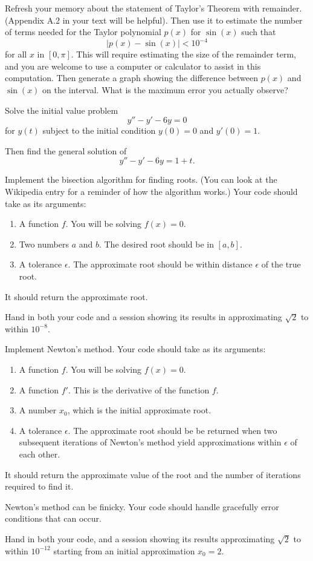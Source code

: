 \documentclass[minion]{homework}
\begin{document}
\begin{problems}

\problem Refresh your memory about the statement of Taylor's Theorem
with remainder.  (Appendix A.2 in your text will be helpful).  Then
use it to estimate the number of terms needed for the Taylor polynomial $p(x)$ for $\sin(x)$ such that
\[
|p(x)-\sin(x)|< 10^{-4}
\]
for all $x$ in $[0,\pi]$.  This will require estimating the size
of the remainder term, and you are welcome to use a computer or calculator to assist in this computation.  Then generate a graph
showing the difference between $p(x)$ and $\sin(x)$ on
the interval.  What is the maximum error you actually observe?

\problem  Solve the initial value problem
\[
y''-y'-6y = 0
\]
for $y(t)$ subject to the initial condition $y(0)=0$ and
$y'(0)=1$.

Then find the general solution of
\[
y''-y'-6y = 1 + t.
\]

\problem Implement the bisection algorithm for finding roots.  (You
can look at the Wikipedia entry for a reminder of how the algorithm works.)
Your code should take as its arguments:
\begin{enumerate}
	\item A function $f$.  You will be solving $f(x)=0$.
	\item Two numbers $a$ and $b$.  The desired root should be in $[a,b]$.
	\item A tolerance $\epsilon$.  The approximate root should be within distance $\epsilon$ of the true root.
\end{enumerate}
It should return the approximate root.

Hand in both your code and a session showing its results in
approximating $\sqrt{2}$ to within $10^{-8}$.

\problem Implement Newton's method. 
Your code should take as its arguments:
\begin{enumerate}
	\item A function $f$.  You will be solving $f(x)=0$.
	\item A function $f'$.  This is the derivative of the function $f$.
	\item A number $x_0$, which is the initial approximate root.
	\item A tolerance $\epsilon$.  The approximate root should be be returned when two subsequent iterations of Newton's method yield
	approximations within $\epsilon$ of each other.
\end{enumerate}
It should return the approximate value of the root and the number of
iterations required to find it.

Newton's method can be finicky.  Your code should handle gracefully
error conditions that can occur.

Hand in both your code, and a session showing its results 
approximating $\sqrt{2}$ to within $10^{-12}$ starting from an initial approximation $x_0=2$.

\end{problems}
\end{document}

